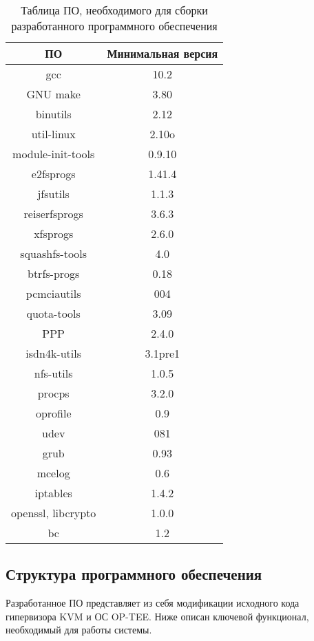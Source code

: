\begin{table}[]
	\begin{center}
		\caption{Таблица ПО, необходимого для сборки разработанного программного обеспечения}
		\label{table:deps}
		\begin{tabular}{|c|c|}
			\hline
			\bfseries ПО & \bfseries Минимальная версия \\
			\hline
			gcc & 10.2 \\ \hline
			GNU make & 3.80 \\ \hline
			binutils & 2.12 \\ \hline
			util-linux & 2.10o \\ \hline
			module-init-tools & 0.9.10 \\ \hline
			e2fsprogs & 1.41.4 \\ \hline
			jfsutils & 1.1.3 \\ \hline
			reiserfsprogs & 3.6.3 \\ \hline
			xfsprogs & 2.6.0 \\ \hline
			squashfs-tools & 4.0 \\ \hline
			btrfs-progs & 0.18 \\ \hline
			pcmciautils & 004 \\ \hline
			quota-tools & 3.09 \\ \hline
			PPP & 2.4.0 \\ \hline
			isdn4k-utils & 3.1pre1 \\ \hline
			nfs-utils & 1.0.5 \\ \hline
			procps & 3.2.0 \\ \hline
			oprofile & 0.9 \\ \hline
			udev & 081 \\ \hline
			grub & 0.93 \\ \hline
			mcelog & 0.6 \\ \hline
			iptables & 1.4.2 \\ \hline
			openssl, libcrypto & 1.0.0 \\ \hline
			bc & 1.2 \\ \hline
		\end{tabular}
	\end{center}
\end{table}

\subsection{Структура программного обеспечения}

Разработанное ПО представляет из себя модификации исходного кода гипервизора KVM и ОС OP-TEE. Ниже описан ключевой функционал, необходимый для работы системы.

